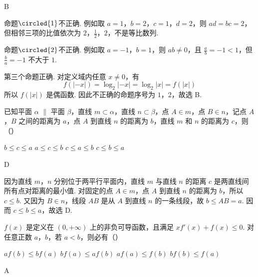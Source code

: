 \begin{answer}
B
\end{answer}

\begin{solution}
命题\(\circled{1}\)不正确. 例如取 \(a=1\)，\(b=2\)，\(c=1\)，\(d=2\)，则 \(ad=bc=2\)，但相邻三项的比值依次为 \(2\)，\(\frac12\)，\(2\)，不是等比数列.

命题\(\circled{2}\)不正确. 例如取 \(a=-1\)，\(b=1\)，则 \(ab\neq0\)，且 \(\frac ab=-1<1\)，但 \(\frac ba=-1\) 不大于 \(1\).

第三个命题正确. 对定义域内任意 \(x\neq0\)，有
\[
f(|-x|)=\log_2|-x|=\log_2|x|=f(|x|)
\]
所以 \(f(|x|)\) 是偶函数. 因此不正确的命题序号为 \(1\)，\(2\)，故选 B.
\end{solution}

\begin{problem}
已知平面 \(\alpha\) \(\parallel\) 平面 \(\beta\)，直线 \(m \subset \alpha\)，直线 \(n \subset \beta\)，点 \(A \in m\)，点 \(B \in n\)，记点 \(A\)，\(B\) 之间的距离为 \(a\)，点 \(A\) 到直线 \(n\) 的距离为 \(b\)，直线 \(m\) 和 \(n\) 的距离为 \(c\)，则（\quad）

\choices
    {\(b \leqslant c \leqslant a\)}
    {\(a \leqslant c \leqslant b\)}
    {\(c \leqslant a \leqslant b\)}
    {\(c \leqslant b \leqslant a\)}
\end{problem}

\begin{answer}
D
\end{answer}

\begin{solution}
因为直线 \(m\)，\(n\) 分别位于两平行平面内，直线 \(m\) 与直线 \(n\) 的距离 \(c\) 是两直线间所有点对距离的最小值. 对固定的点 \(A\in m\)，点 \(A\) 到直线 \(n\) 的距离为 \(b\)，所以 \(c\leqslant b\). 又因为 \(B\in n\)，线段 \(AB\) 是从 \(A\) 到直线 \(n\) 的一条线段，故 \(b\leqslant AB=a\). 因而 \(c\leqslant b\leqslant a\)，故选 D.
\end{solution}

\begin{problem}
\(f(x)\) 是定义在 \((0, + \infty)\) 上的非负可导函数，且满足 \(x f'(x) + f(x) \leqslant 0\). 对任意正数 \(a\)，\(b\)，若 \(a < b\)，则必有（\quad）

\choices
    {\(a f(b)\leqslant b f(a)\)}
    {\(b f(a)\leqslant a f(b)\)}
    {\(a f(a)\leqslant f(b)\)}
    {\(b f(b)\leqslant f(a)\)}
\end{problem}

\begin{answer}
A
\end{answer}

